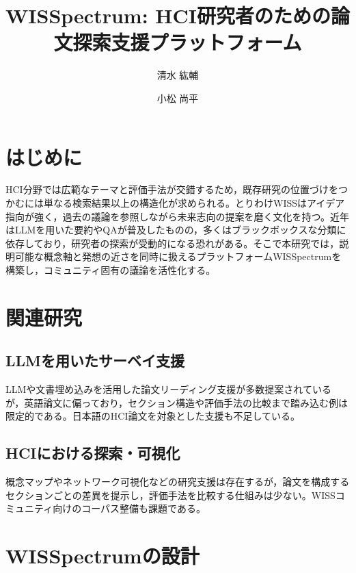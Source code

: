 \documentclass[twoside]{wiss}
\begin{document}
\title{WISSpectrum: HCI研究者のための論文探索支援プラットフォーム}
\author{清水 紘輔}
\author{小松 尚平}

\begin{abstract}


\end{abstract}

\maketitle

\section{はじめに}
HCI分野では広範なテーマと評価手法が交錯するため，既存研究の位置づけをつかむには単なる検索結果以上の構造化が求められる。とりわけWISSはアイデア指向が強く，過去の議論を参照しながら未来志向の提案を磨く文化を持つ。近年はLLMを用いた要約やQAが普及したものの，多くはブラックボックスな分類に依存しており，研究者の探索が受動的になる恐れがある。そこで本研究では，説明可能な概念軸と発想の近さを同時に扱えるプラットフォームWISSpectrumを構築し，コミュニティ固有の議論を活性化する。

\section{関連研究}
\subsection{LLMを用いたサーベイ支援}
LLMや文書埋め込みを活用した論文リーディング支援が多数提案されているが，英語論文に偏っており，セクション構造や評価手法の比較まで踏み込む例は限定的である。日本語のHCI論文を対象とした支援も不足している。

\subsection{HCIにおける探索・可視化}
概念マップやネットワーク可視化などの研究支援は存在するが，論文を構成するセクションごとの差異を提示し，評価手法を比較する仕組みは少ない。WISSコミュニティ向けのコーパス整備も課題である。

\section{WISSpectrumの設計}
\end{document}
